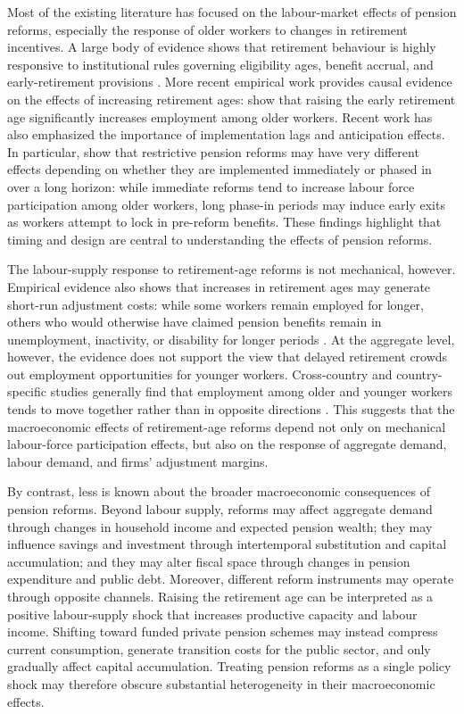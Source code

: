 \documentclass[11pt,english,a4paper, twoside, authoryear]{article}
\begin{document}
Most of the existing literature has focused on the labour-market effects of pension reforms, especially the response of older workers to changes in retirement incentives. A large body of evidence shows that retirement behaviour is highly responsive to institutional rules governing eligibility ages, benefit accrual, and early-retirement provisions \citep{GruberWise1999}. More recent empirical work provides causal evidence on the effects of increasing retirement ages: \citet{StaubliZweimuller2013} show that raising the early retirement age significantly increases employment among older workers. Recent work has also emphasized the importance of implementation lags and anticipation effects. In particular, \citet{BiZubairy2023} show that restrictive pension reforms may have very different effects depending on whether they are implemented immediately or phased in over a long horizon: while immediate reforms tend to increase labour force participation among older workers, long phase-in periods may induce early exits as workers attempt to lock in pre-reform benefits. These findings highlight that timing and design are central to understanding the effects of pension reforms.

The labour-supply response to retirement-age reforms is not mechanical, however. Empirical evidence also shows that increases in retirement ages may generate short-run adjustment costs: while some workers remain employed for longer, others who would otherwise have claimed pension benefits remain in unemployment, inactivity, or disability for longer periods \citep{Rabate2020, Dubois2016, Leduigou2016}. At the aggregate level, however, the evidence does not support the view that delayed retirement crowds out employment opportunities for younger workers. Cross-country and country-specific studies generally find that employment among older and younger workers tends to move together rather than in opposite directions \citep{MunnellWu2012, Wise2017, Kalwij2010, BenSalem2010}. This suggests that the macroeconomic effects of retirement-age reforms depend not only on mechanical labour-force participation effects, but also on the response of aggregate demand, labour demand, and firms' adjustment margins.

By contrast, less is known about the broader macroeconomic consequences of pension reforms. Beyond labour supply, reforms may affect aggregate demand through changes in household income and expected pension wealth; they may influence savings and investment through intertemporal substitution and capital accumulation; and they may alter fiscal space through changes in pension expenditure and public debt. Moreover, different reform instruments may operate through opposite channels. Raising the retirement age can be interpreted as a positive labour-supply shock that increases productive capacity and labour income. Shifting toward funded private pension schemes may instead compress current consumption, generate transition costs for the public sector, and only gradually affect capital accumulation. Treating pension reforms as a single policy shock may therefore obscure substantial heterogeneity in their macroeconomic effects.
\end{document}
